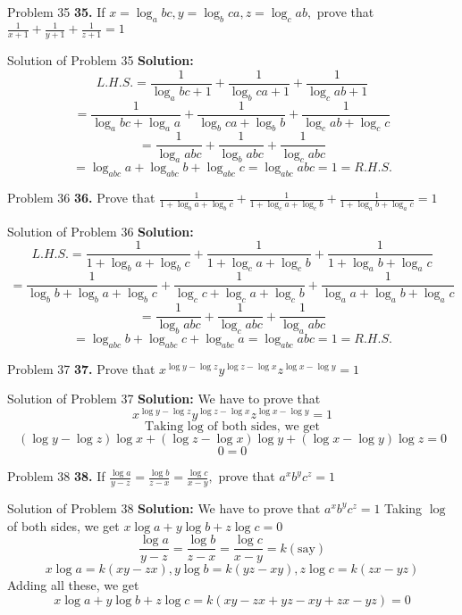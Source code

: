 \documentclass[aspectratio=1610,8pt]{beamer}
\begin{document}
\begin{frame}{Problem 35}
  \textbf{35.} If $x = \log_abc, y = \log_bca, z = \log_cab,$ prove that $\frac{1}{x + 1} + \frac{1}{y + 1} + \frac{1}{z + 1} = 1$
\end{frame}
\begin{frame}{Solution of Problem 35}
  \textbf{Solution:} $$L.H.S. = \frac{1}{\log_abc + 1} + \frac{1}{\log_bca + 1} + \frac{1}{\log_cab + 1}$$
  $$= \frac{1}{\log_abc + \log_aa} + \frac{1}{\log_bca + \log_bb} + \frac{1}{\log_cab + \log_cc}$$
  $$= \frac{1}{\log_aabc} + \frac{1}{\log_babc} + \frac{1}{\log_cabc}$$
  $$= \log_{abc}a + \log_{abc}b + \log_{abc}c = \log_{abc}abc = 1 = R.H.S.$$
\end{frame}
\begin{frame}{Problem 36}
  \textbf{36.} Prove that $\frac{1}{1 + \log_ba + \log_bc} + \frac{1}{1 + \log_ca + \log_cb} + \frac{1}{1 + \log_ab + \log_ac} = 1$
\end{frame}
\begin{frame}{Solution of Problem 36}
  \textbf{Solution:} $$L.H.S. = \frac{1}{1 + \log_ba + \log_bc} + \frac{1}{1 + \log_ca + \log_cb} + \frac{1}{1 + \log_ab + \log_ac}$$
  $$= \frac{1}{\log_bb + \log_ba + \log_bc} + \frac{1}{\log_cc + \log_ca + \log_cb} + \frac{1}{\log_aa + \log_ab + \log_ac}$$
  $$= \frac{1}{\log_babc} + \frac{1}{\log_cabc} + \frac{1}{\log_aabc}$$
  $$= \log_{abc}b + \log_{abc}c + \log_{abc}a = \log_{abc}abc = 1 = R.H.S.$$
\end{frame}
\begin{frame}{Problem 37}
  \textbf{37.} Prove that $x^{\log y - \log z}y^{\log z - \log x}z^{\log x - \log y} = 1$
\end{frame}
\begin{frame}{Solution of Problem 37}
  \textbf{Solution:} We have to prove that $$x^{\log y - \log z}y^{\log z - \log x}z^{\log x - \log y} = 1$$
  $$\text{Taking~} \log \text{~of both sides, we get}$$
  $$(\log y - \log z)\log x + (\log z - \log x)\log y + (\log x - \log y)\log z = 0$$
  $$0=0$$
\end{frame}
\begin{frame}{Problem 38}
  \textbf{38.} If $\frac{\log a}{y - z} = \frac{\log b}{z - x} = \frac{\log c}{x - y},$ prove that $a^xb^yc^z = 1$
\end{frame}
\begin{frame}{Solution of Problem 38}
  \textbf{Solution:} We have to prove that $a^xb^yc^z = 1$
  \linebreak\linebreak
  Taking $\log$ of both sides, we get $x\log a + y\log b + z\log c = 0$
  $$\frac{\log a}{y - z} = \frac{\log b}{z - x} = \frac{\log c}{x - y} = k(\text{say})$$
  $$x\log a = k(xy - zx), y\log b = k(yz - xy), z\log c = k(zx - yz)$$
  Adding all these, we get
  $$x\log a + y\log b + z\log c = k(xy - zx + yz - xy + zx - yz) = 0$$
\end{frame}
\end{document}
